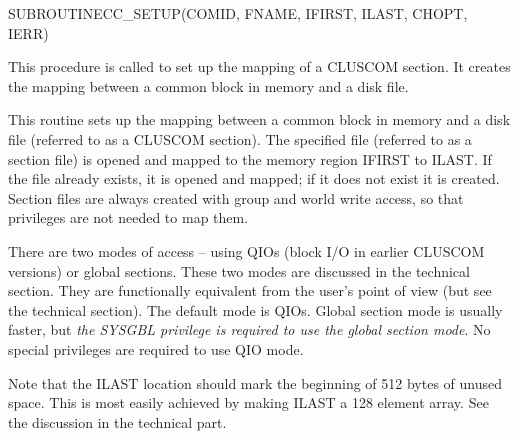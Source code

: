 \begin{routine} %
\subroutine
   {SUBROUTINE}{CC\_SETUP}{(COMID, FNAME, IFIRST, ILAST, CHOPT, IERR)}
\begin{overview}
This procedure is called to set up the mapping of a
CLUSCOM section. It creates the
mapping between a common block in memory and a disk file.
\end{overview}
\begin{argdeflist}
\end{argdeflist}
\begin{describe}
This routine sets up the mapping between a common block in memory and
a disk file (referred to as a CLUSCOM section).
The specified file (referred to as a section file)
is opened and mapped to the memory
region IFIRST to ILAST. If the file already exists, it is opened and
mapped; if it does not exist it is created. Section files are always
created with group and world write access, so that privileges are
not needed to map them.

There are two modes of access -- using QIOs (block I/O in earlier
CLUSCOM versions) or global sections.
These two modes are discussed in the technical section.
They are functionally equivalent from the user's point of view (but see
the technical section).
The default mode is QIOs. Global section mode is usually faster,
but {\em the SYSGBL privilege is required to use the global section
 mode}. No special privileges are required to use QIO mode.

Note that the ILAST location should mark the beginning of 512 bytes
of unused space. This is most easily achieved by making ILAST a 128 element
array. See the discussion in the technical part.


\end{describe}
\end{routine}
